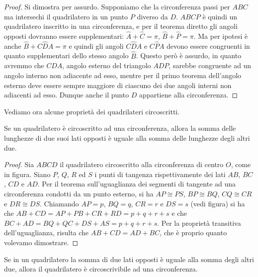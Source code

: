 \begin{proof}
Si dimostra per assurdo. Supponiamo che la circonferenza passi per $ABC$ ma intersechi il quadrilatero in un punto $P$ diverso da $D$. $ABCP$ è quindi un quadrilatero inscritto in una circonferenza, e per il teorema diretto gli angoli opposti dovranno essere supplementari: $\widehat{A}+\widehat{C}=\pi$, $\widehat{B}+\widehat{P}=\pi$. Ma per ipotesi è anche $\widehat{B}+C\widehat{D}A=\pi$ e quindi gli angoli $C\widehat{D}A$ e $C\widehat{P}A$ devono essere congruenti in quanto supplementari dello stesso angolo $\widehat{B}$. Questo però è assurdo, in quanto avremmo che $C\widehat{D}A$, angolo esterno del triangolo $ADP$, sarebbe congruente ad un angolo interno non adiacente ad esso, mentre per il primo teorema dell'angolo esterno deve essere sempre maggiore di ciascuno dei due angoli interni non adiacenti ad esso. Dunque anche il punto $D$ appartiene alla circonferenza.
\end{proof}

Vediamo ora alcune proprietà dei quadrilateri circoscritti.

\begin{teorema}\label{teo:6.6}
Se un quadrilatero è circoscritto ad una circonferenza, allora la somma delle lunghezze di due suoi lati opposti è uguale alla somma delle lunghezze degli altri due.
\end{teorema}

\begin{figure}[htb]
	\centering
\end{figure}

\begin{proof}
Sia $ABCD$ il quadrilatero circoscritto alla circonferenza di centro $O$, come in figura. Siano $P$, $Q$, $R$ ed $S$ i punti di tangenza rispettivamente dei lati $AB$, $BC$, $CD$ e $AD$. Per il teorema sull'uguaglianza dei segmenti di tangente ad una circonferenza condotti da un punto esterno, si ha $AP\cong PS$, $BP\cong BQ$, $CQ\cong CR$ e $DR\cong DS$. Chiamando $AP=p$, $BQ=q$, $CR=r$ e $DS=s$ (vedi figura) si ha che $AB+CD = AP+PB+CR+RD = p+q+r+s$ e che $BC+AD = BQ+QC+DS+AS = p+q+r+s$.
Per la proprietà transitiva dell'uguaglianza, risulta che $AB+CD=AD+BC$, che è proprio quanto volevamo dimostrare.
\end{proof}

\begin{teorema}
Se in un quadrilatero la somma di due lati opposti è uguale alla somma degli altri due, allora il quadrilatero è circoscrivibile ad una circonferenza.
\end{teorema}

